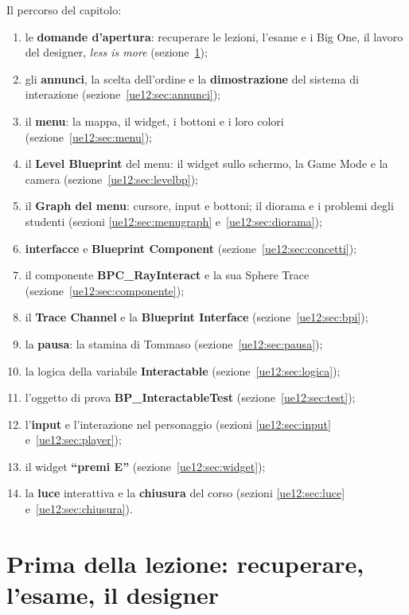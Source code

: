 Il percorso del capitolo:
\begin{enumerate}
  \item le \textbf{domande d'apertura}: recuperare le lezioni, l'esame e i Big One, il
        lavoro del designer, \emph{less is more} (sezione~\ref{ue12:sec:inizio});
  \item gli \textbf{annunci}, la scelta dell'ordine e la \textbf{dimostrazione} del
        sistema di interazione (sezione~\ref{ue12:sec:annunci});
  \item il \textbf{menu}: la mappa, il widget, i bottoni e i loro colori
        (sezione~\ref{ue12:sec:menu});
  \item il \textbf{Level Blueprint} del menu: il widget sullo schermo, la Game Mode e la
        camera (sezione~\ref{ue12:sec:levelbp});
  \item il \textbf{Graph del menu}: cursore, input e bottoni; il diorama e i problemi
        degli studenti (sezioni \ref{ue12:sec:menugraph} e~\ref{ue12:sec:diorama});
  \item \textbf{interfacce} e \textbf{Blueprint Component} (sezione~\ref{ue12:sec:concetti});
  \item il componente \textbf{BPC\_RayInteract} e la sua Sphere Trace
        (sezione~\ref{ue12:sec:componente});
  \item il \textbf{Trace Channel} e la \textbf{Blueprint Interface}
        (sezione~\ref{ue12:sec:bpi});
  \item la \textbf{pausa}: la stamina di Tommaso (sezione~\ref{ue12:sec:pausa});
  \item la logica della variabile \textbf{Interactable} (sezione~\ref{ue12:sec:logica});
  \item l'oggetto di prova \textbf{BP\_InteractableTest} (sezione~\ref{ue12:sec:test});
  \item l'\textbf{input} e l'interazione nel personaggio (sezioni \ref{ue12:sec:input}
        e~\ref{ue12:sec:player});
  \item il widget \textbf{``premi E''} (sezione~\ref{ue12:sec:widget});
  \item la \textbf{luce} interattiva e la \textbf{chiusura} del corso (sezioni
        \ref{ue12:sec:luce} e~\ref{ue12:sec:chiusura}).
\end{enumerate}

\section{Prima della lezione: recuperare, l'esame, il designer}
\label{ue12:sec:inizio}

